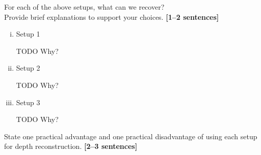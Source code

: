 \documentclass{csci1430}
\begin{document}
\begin{subquestion}[points=3]
For each of the above setups, what can we recover?\\
Provide brief explanations to support your choices. \textbf{[1--2 sentences]}
\end{subquestion}
\begin{enumerate}[(i),itemsep=0pt,parsep=0pt,topsep=0pt]
\item Setup 1\\
\begin{answer}[height=4]
TODO Why?
\end{answer}

\item Setup 2\\
\begin{answer}[height=4]
TODO Why?
\end{answer}

\item Setup 3\\
\begin{answer}[height=4]
TODO Why?
\end{answer}

\end{enumerate}

\pagebreak
\begin{subquestion}[points=3]
State one practical advantage and one practical disadvantage of using each setup for depth reconstruction. \textbf{[2--3 sentences]}
\end{subquestion}
\end{document}
